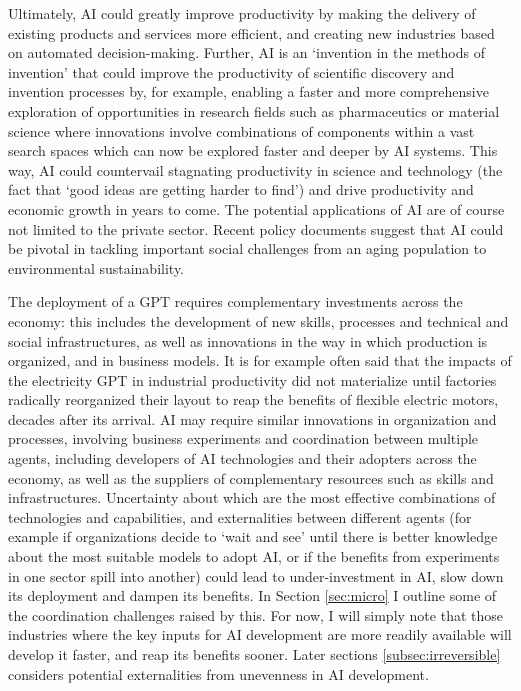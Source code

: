 \documentclass[11pt]{article}
\begin{document}
Ultimately, AI could greatly improve productivity by making the delivery of existing products and services more efficient, and creating new industries based on automated decision-making. Further, AI is an `invention in the methods of invention' that could improve the productivity of scientific discovery and invention processes by, for example, enabling a faster and more comprehensive exploration of opportunities in research fields such as pharmaceutics or material science where innovations involve combinations of components within a vast search spaces which can now be explored faster and deeper by AI systems. This way, AI could countervail stagnating productivity in science and technology (the fact that `good ideas are getting harder to find') and drive productivity and economic growth in years to come.  The potential applications of AI are of course not limited to the private sector. Recent policy documents suggest that AI could be pivotal in tackling important social challenges from an aging population to environmental sustainability. 

The deployment of a GPT requires complementary investments across the economy: this includes the development of new skills, processes and technical and social infrastructures, as well as innovations in the way in which production is organized, and in business models. It is for example often said that the impacts of the electricity GPT in industrial productivity did not materialize until factories radically reorganized their layout to reap the benefits of flexible electric motors, decades after its arrival. AI may require similar innovations in organization and processes, involving business experiments and coordination between multiple agents, including developers of AI technologies and their adopters across the economy, as well as the suppliers of complementary resources such as skills and infrastructures. Uncertainty about which are the most effective combinations of technologies and capabilities, and externalities between different agents (for example if organizations decide to `wait and see' until there is better knowledge about the most suitable models to adopt AI, or if the benefits from experiments in one sector spill into another) could lead to under-investment in AI, slow down its deployment and dampen its benefits. In Section \ref{sec:micro} I outline some of the coordination challenges raised by this. For now, I will simply note that those industries where the key inputs for AI development are more readily available will develop it faster, and reap its benefits sooner. Later sections \ref{subsec:irreversible} considers potential externalities from unevenness in AI development.
\end{document}
